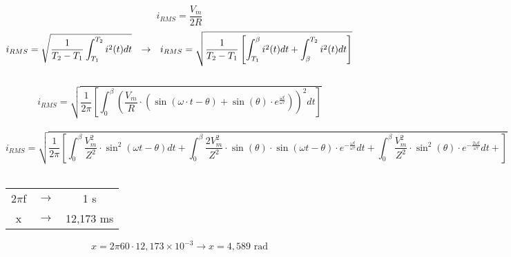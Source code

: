 \documentclass{article}
\begin{document}
        \[
            \boxed{i_{RMS} = \frac{V_{m}}{2R}}
        \]
\newpage
        \[
            i_{RMS} = \sqrt{\frac{1}{T_{2} - T_{1}} \int_{T_{1}}^{T_{2}} i^{2}(t) dt}
            \hspace{2.5mm}
            \to
            \hspace{2.5mm}
            i_{RMS} = \sqrt{\frac{1}{T_{2} - T_{1}} \left[ \int_{T_{1}}^{\beta} i^{2}(t) dt + \int_{\beta}^{T_{2}} i^{2}(t) dt \right]}
        \]\\
        \[
            i_{RMS} = 
                    \sqrt{ \frac{1}{2 \pi}
                        \left[
                            \int_{0}^{\beta} {
                                \left(
                                    \frac{V_{m}}{R} \cdot (\sin(\omega \cdot t - \theta) + \sin(\theta) \cdot e^{\frac{\omega t}{\omega \tau}} )
                                \right)}^{2} dt 
                        \right]
                    }
        \]\\
        \[
            \boxed{
                i_{RMS} = 
                    \sqrt{
                        \frac{1}{2\pi}
                            \left[
                                \int_{0}^{\beta}
                                    \frac{V_{m}^{2}}{Z^{2}} \cdot \sin^{2}(\omega t - \theta) dt +
                                \int_{0}^{\beta}
                                    \frac{2 V_{m}^{2}}{Z^{2}} \cdot \sin(\theta) \cdot \sin(\omega t - \theta) \cdot e^{-\frac{\omega t}{\omega \tau}} dt +
                                \int_{0}^{\beta}
                                    \frac{V_{m}^{2}}{Z^{2}} \cdot \sin^{2}(\theta) \cdot e^{-\frac{2\omega t}{\omega \tau}} dt +
                            \right]
                    }
            }
        \]\\
\newpage

        \begin{table}[H]
            \centering
            \begin{tabular}{c c c}
                2$\pi$f & $\to$ & 1 s\\
                x        & $\to$ & 12,173 ms\\
            \end{tabular}
        \end{table}
        \[
            x = 2 \pi 60 \cdot 12,173 \times 10^{-3} \to x = 4,589 \text{ rad}
        \]
\end{document}
